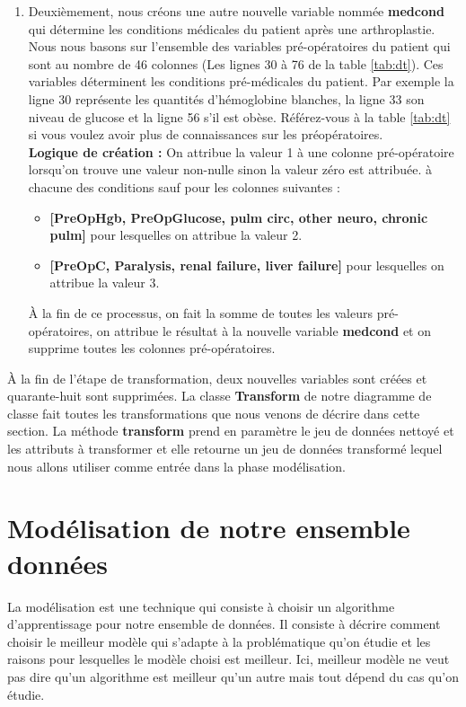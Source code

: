 \documentclass[12pt, french]{report}
\begin{document}
\begin{enumerate}[label=\Roman*.]
\item Deuxièmement, nous créons une autre nouvelle  variable nommée \textbf{medcond} qui détermine les conditions médicales du patient après une arthroplastie. Nous nous basons sur l'ensemble des variables pré-opératoires du patient qui sont au nombre de 46 colonnes (Les lignes 30 à 76 de la table \ref{tab:dt}). Ces variables déterminent les conditions pré-médicales du patient. Par exemple la ligne 30 représente les quantités d'hémoglobine blanches, la ligne 33  son niveau de glucose et la ligne 56 s'il est obèse. Référez-vous à la table \ref{tab:dt} si vous voulez avoir plus de connaissances sur les préopératoires.\\
\textbf{Logique de création : }  On attribue la valeur 1 à une colonne pré-opératoire lorsqu'on trouve une valeur non-nulle sinon la valeur zéro est attribuée. à chacune des conditions sauf pour les colonnes suivantes :
\begin{itemize}
\item \textbf{[PreOpHgb, PreOpGlucose, pulm circ, other neuro, chronic pulm]} pour lesquelles on attribue la valeur 2.
\item \textbf{[PreOpC, Paralysis, renal failure, liver failure]}  pour lesquelles on attribue la valeur 3.
\end{itemize}
À la fin de ce processus, on fait la somme de toutes les valeurs pré-opératoires, on attribue le résultat à la nouvelle variable \textbf{medcond} et on supprime toutes les colonnes pré-opératoires.
\end{enumerate}

À la fin de l'étape de transformation, deux nouvelles variables sont créées et quarante-huit sont supprimées. La classe \textbf{Transform} de notre diagramme de classe fait toutes les transformations que nous venons de décrire dans cette section. La méthode \textbf{transform} prend en paramètre le jeu de données nettoyé et les attributs à transformer et elle retourne un jeu de données transformé lequel nous allons utiliser comme entrée dans la phase modélisation. 

\section{Modélisation de notre ensemble données}

La modélisation est une technique qui consiste à choisir un algorithme d'apprentissage pour notre ensemble de données. Il consiste à décrire comment choisir le meilleur modèle qui s'adapte à la problématique qu'on étudie et les raisons pour lesquelles le modèle choisi est meilleur. Ici, meilleur modèle ne veut pas dire qu'un algorithme est meilleur qu'un autre mais tout dépend du cas qu'on étudie.\\
\end{document}
